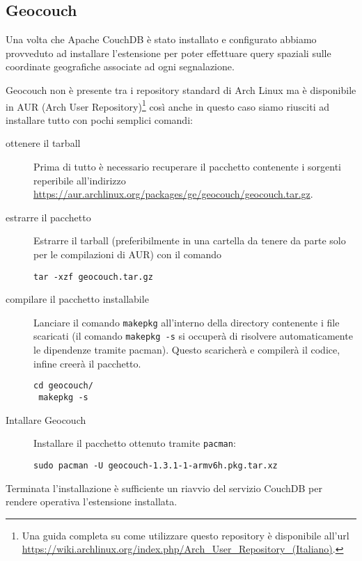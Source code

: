         \subsection{Geocouch}
            Una volta che Apache CouchDB\texttrademark{} è stato installato e
            configurato abbiamo provveduto ad installare l'estensione per
            poter effettuare query spaziali sulle coordinate geografiche
            associate ad ogni segnalazione.

            Geocouch non è presente tra i repository standard di Arch Linux ma
            è disponibile in AUR (Arch User Repository)\footnote{Una guida
            completa su come utilizzare questo repository è disponibile
            all'url
            \url{https://wiki.archlinux.org/index.php/Arch_User_Repository_(Italiano)}.}
            così anche in questo caso siamo riusciti ad installare tutto con
            pochi semplici comandi:
            \begin{description}
                \item[ottenere il tarball]
                Prima di tutto è necessario recuperare il pacchetto
                contenente i sorgenti reperibile all'indirizzo
                \url{https://aur.archlinux.org/packages/ge/geocouch/geocouch.tar.gz}.
                \item[estrarre il pacchetto]
                Estrarre il tarball (preferibilmente in una cartella da tenere
                da parte solo per le compilazioni di AUR) con il comando
                \begin{lstlisting}[language=plane]
 tar -xzf geocouch.tar.gz
                \end{lstlisting}
                \item[compilare il pacchetto installabile]
                Lanciare il comando \texttt{makepkg} all'interno della directory
                contenente i file scaricati (il comando \texttt{makepkg -s} si
                occuperà di risolvere automaticamente le dipendenze tramite
                pacman). Questo scaricherà e compilerà il codice, infine
                creerà il pacchetto.
                \begin{lstlisting}[language=plane]
 cd geocouch/
 makepkg -s
                \end{lstlisting}
                \item[Intallare Geocouch]
                Installare il pacchetto ottenuto tramite \texttt{pacman}:
                \begin{lstlisting}[language=plane]
 sudo pacman -U geocouch-1.3.1-1-armv6h.pkg.tar.xz
                \end{lstlisting}
            \end{description}
            Terminata l'installazione è sufficiente un riavvio del servizio
            CouchDB per rendere operativa l'estensione installata.

